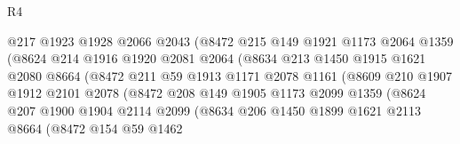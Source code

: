 \begin{lexlean}{R4}
\begin{coremodule}
                            @217
                            @1923
                            @1928
                            @2066
                            @2043
                            (@8472
                              @215
                              @149
                              @1921
                              @1173
                              @2064
                              @1359
                              (@8624
                                @214
                                @1916
                                @1920
                                @2081
                                @2064
                                (@8634
                                  @213
                                  @1450
                                  @1915
                                  @1621
                                  @2080
                                  @8664
                                  (@8472
                                    @211
                                    @59
                                    @1913
                                    @1171
                                    @2078
                                    @1161
                                    (@8609
                                      @210
                                      @1907
                                      @1912
                                      @2101
                                      @2078
                                      (@8472
                                        @208
                                        @149
                                        @1905
                                        @1173
                                        @2099
                                        @1359
                                        (@8624
                                          @207
                                          @1900
                                          @1904
                                          @2114
                                          @2099
                                          (@8634
                                            @206
                                            @1450
                                            @1899
                                            @1621
                                            @2113
                                            @8664
                                            (@8472
                                              @154
                                              @59
                                              @1462

\end{coremodule}
\end{lexlean}
